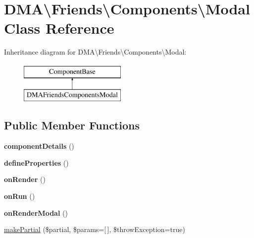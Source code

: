 \hypertarget{classDMA_1_1Friends_1_1Components_1_1Modal}{\section{D\+M\+A\textbackslash{}Friends\textbackslash{}Components\textbackslash{}Modal Class Reference}
\label{classDMA_1_1Friends_1_1Components_1_1Modal}
}
Inheritance diagram for D\+M\+A\textbackslash{}Friends\textbackslash{}Components\textbackslash{}Modal\+:\begin{figure}[H]
\begin{center}
\leavevmode
\includegraphics[height=2.000000cm]{df/da2/classDMA_1_1Friends_1_1Components_1_1Modal}
\end{center}
\end{figure}
\subsection*{Public Member Functions}
\begin{DoxyCompactItemize}
\item 
\hypertarget{classDMA_1_1Friends_1_1Components_1_1Modal_ad951492cf8acea02e0eaf24a029c0851}{{\bfseries component\+Details} ()}\label{classDMA_1_1Friends_1_1Components_1_1Modal_ad951492cf8acea02e0eaf24a029c0851}

\item 
\hypertarget{classDMA_1_1Friends_1_1Components_1_1Modal_aa109062a7350b8bd5dd168ede6aafd76}{{\bfseries define\+Properties} ()}\label{classDMA_1_1Friends_1_1Components_1_1Modal_aa109062a7350b8bd5dd168ede6aafd76}

\item 
\hypertarget{classDMA_1_1Friends_1_1Components_1_1Modal_ac8ccab598d85dc5339912bd627cd51a8}{{\bfseries on\+Render} ()}\label{classDMA_1_1Friends_1_1Components_1_1Modal_ac8ccab598d85dc5339912bd627cd51a8}

\item 
\hypertarget{classDMA_1_1Friends_1_1Components_1_1Modal_aed8e6b9a32f34a292d8a64619d483786}{{\bfseries on\+Run} ()}\label{classDMA_1_1Friends_1_1Components_1_1Modal_aed8e6b9a32f34a292d8a64619d483786}

\item 
\hypertarget{classDMA_1_1Friends_1_1Components_1_1Modal_a524d66800c7799a474a280e6fa77933c}{{\bfseries on\+Render\+Modal} ()}\label{classDMA_1_1Friends_1_1Components_1_1Modal_a524d66800c7799a474a280e6fa77933c}

\item 
\hyperlink{classDMA_1_1Friends_1_1Components_1_1Modal_a4e45e161a2624a34d59bf56294122ced}{make\+Partial} (\$partial, \$params=\mbox{[}$\,$\mbox{]}, \$throw\+Exception=true)
\end{DoxyCompactItemize}
